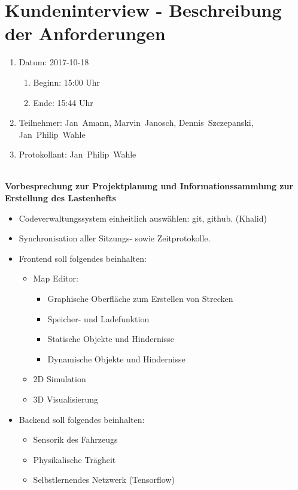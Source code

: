 \pagebreak
\section[Kundeninterview - 2017-10-18]{Kundeninterview - Beschreibung der Anforderungen}

\begin{enumerate}
	\item Datum: 2017-10-18
	\begin{enumerate}[label*=\arabic*.]
		\item Beginn: 15:00 Uhr
		\item Ende: 15:44 Uhr
	\end{enumerate}

	\item Teilnehmer:
	\subitem Jan~Amann, Marvin~Janosch, Dennis~Szczepanski, Jan~Philip~Wahle

	\item Protokollant: Jan~Philip~Wahle
\end{enumerate}
\ \\
\textbf{Vorbesprechung zur Projektplanung und Informationssammlung zur Erstellung des Lastenhefts}

\begin{itemize}
	\item Codeverwaltungssystem einheitlich auswählen: git, github. (Khalid)
	\item Synchronisation aller Sitzungs- sowie Zeitprotokolle.
	\item Frontend soll folgendes beinhalten:
	\begin{itemize}
		\item Map Editor:
		\begin{itemize}
			\item Graphische Oberfläche zum Erstellen von Strecken
			\item Speicher- und Ladefunktion
			\item Statische Objekte und Hindernisse
			\item Dynamische Objekte und Hindernisse
		\end{itemize}
		\item 2D Simulation
		\item 3D Visualisierung
	\end{itemize}
	\item Backend soll folgendes beinhalten:
	\begin{itemize}
		\item Sensorik des Fahrzeugs
		\item Physikalische Trägheit
		\item Selbstlernendes Netzwerk (Tensorflow)
	\end{itemize}
\end{itemize}